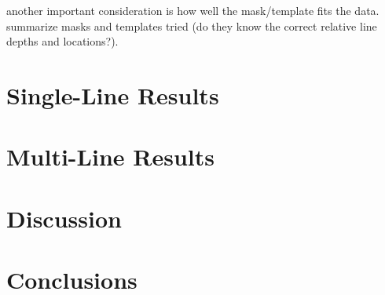 \documentclass[twocolumn]{aastex61}
\begin{document}
another important consideration is how well the mask/template fits the data. summarize masks and templates tried (do they know the correct relative line depths and locations?).

\section{Single-Line Results}

\section{Multi-Line Results}

\section{Discussion}

\section{Conclusions}

\acknowledgements


\end{document}
